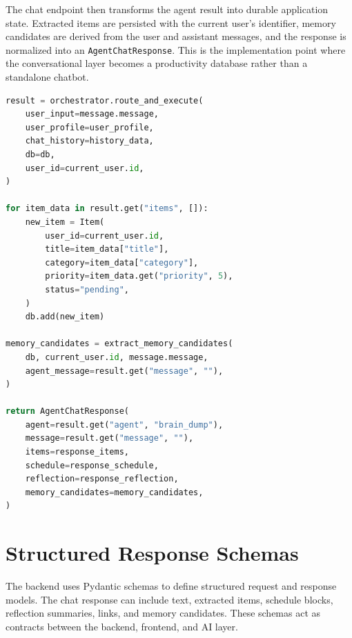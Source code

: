 The chat endpoint then transforms the agent result into durable application state. Extracted items are persisted with the current user's identifier, memory candidates are derived from the user and assistant messages, and the response is normalized into an \texttt{AgentChatResponse}. This is the implementation point where the conversational layer becomes a productivity database rather than a standalone chatbot.

\begin{lstlisting}[language=Python,caption={Chat route persistence and response normalization},label={lst:chat-persistence}]
result = orchestrator.route_and_execute(
    user_input=message.message,
    user_profile=user_profile,
    chat_history=history_data,
    db=db,
    user_id=current_user.id,
)

for item_data in result.get("items", []):
    new_item = Item(
        user_id=current_user.id,
        title=item_data["title"],
        category=item_data["category"],
        priority=item_data.get("priority", 5),
        status="pending",
    )
    db.add(new_item)

memory_candidates = extract_memory_candidates(
    db, current_user.id, message.message,
    agent_message=result.get("message", ""),
)

return AgentChatResponse(
    agent=result.get("agent", "brain_dump"),
    message=result.get("message", ""),
    items=response_items,
    schedule=response_schedule,
    reflection=response_reflection,
    memory_candidates=memory_candidates,
)
\end{lstlisting}


\section{Structured Response Schemas}

The backend uses Pydantic schemas to define structured request and response models. The chat response can include text, extracted items, schedule blocks, reflection summaries, links, and memory candidates. These schemas act as contracts between the backend, frontend, and AI layer.

